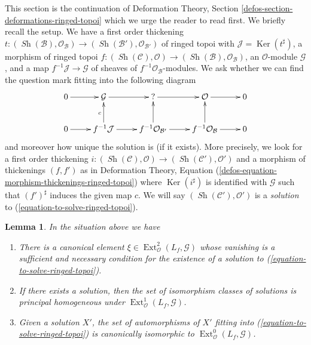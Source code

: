 \documentclass{stacks-project}
\theoremstyle{plain}
\newtheorem{lemma}[subsection]{Lemma}
\theoremstyle{definition}
\theoremstyle{remark}
\numberwithin{equation}{subsection}
\def\Ext{\mathop{\mathrm{Ext}}\nolimits}
\def\Sh{\mathop{\mathit{Sh}}\nolimits}
\def\Ker{\mathop{\mathrm{Ker}}}
\begin{document}
\noindent
This section is the continuation of
Deformation Theory, Section \ref{defos-section-deformations-ringed-topoi}
which we urge the reader to read first. We briefly recall the setup.
We have a first order thickening
$t : (\Sh(\mathcal{B}), \mathcal{O}_\mathcal{B}) \to
(\Sh(\mathcal{B}'), \mathcal{O}_{\mathcal{B}'})$ of ringed topoi
with $\mathcal{J} = \Ker(t^\sharp)$, a morphism of ringed topoi
$f : (\Sh(\mathcal{C}), \mathcal{O}) \to
(\Sh(\mathcal{B}), \mathcal{O}_\mathcal{B})$, an $\mathcal{O}$-module
$\mathcal{G}$, and a map $f^{-1}\mathcal{J} \to \mathcal{G}$
of sheaves of $f^{-1}\mathcal{O}_\mathcal{B}$-modules.
We ask whether we can find
the question mark fitting into the following diagram
\begin{equation}
\label{equation-to-solve-ringed-topoi}
\vcenter{
\xymatrix{
0 \ar[r] & \mathcal{G} \ar[r] & {?} \ar[r] & \mathcal{O} \ar[r] & 0 \\
0 \ar[r] & f^{-1}\mathcal{J} \ar[u]^c \ar[r] &
f^{-1}\mathcal{O}_{\mathcal{B}'} \ar[u] \ar[r] &
f^{-1}\mathcal{O}_\mathcal{B} \ar[u] \ar[r] & 0
}
}
\end{equation}
and moreover how unique the solution is (if it exists). More precisely,
we look for a first order thickening
$i : (\Sh(\mathcal{C}), \mathcal{O}) \to (\Sh(\mathcal{C}'), \mathcal{O}')$
and a morphism of thickenings $(f, f')$ as in
Deformation Theory, Equation
(\ref{defos-equation-morphism-thickenings-ringed-topoi})
where $\Ker(i^\sharp)$ is identified with $\mathcal{G}$
such that $(f')^\sharp$ induces the given map $c$.
We will say $(\Sh(\mathcal{C}'), \mathcal{O}')$ is a {\it solution} to
(\ref{equation-to-solve-ringed-topoi}).

\begin{lemma}
\label{lemma-find-obstruction-ringed-topoi}
In the situation above we have
\begin{enumerate}
\item There is a canonical element
$\xi \in \Ext^2_\mathcal{O}(L_f, \mathcal{G})$
whose vanishing is a sufficient and necessary condition for the existence
of a solution to (\ref{equation-to-solve-ringed-topoi}).
\item If there exists a solution, then the set of
isomorphism classes of solutions is principal homogeneous under
$\Ext^1_\mathcal{O}(L_f, \mathcal{G})$.
\item Given a solution $X'$, the set of automorphisms of $X'$
fitting into (\ref{equation-to-solve-ringed-topoi}) is canonically isomorphic
to $\Ext^0_\mathcal{O}(L_f, \mathcal{G})$.
\end{enumerate}
\end{lemma}
\end{document}
